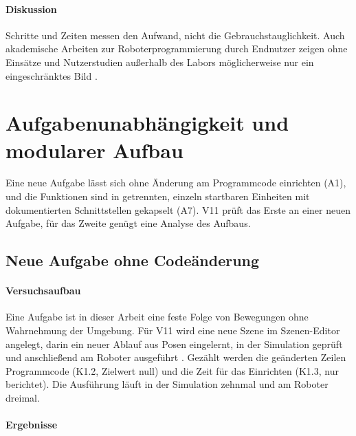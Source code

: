 
\paragraph*{Diskussion}
Schritte und Zeiten messen den Aufwand, nicht die Gebrauchstauglichkeit.
Auch akademische Arbeiten zur Roboterprogrammierung durch Endnutzer zeigen ohne Einsätze und Nutzerstudien außerhalb des Labors möglicherweise nur ein eingeschränktes Bild \cite{Ajaykumar2021}.

\section{Aufgabenunabhängigkeit und modularer Aufbau}
\label{sec:eval_f4}
Eine neue Aufgabe lässt sich ohne Änderung am Programmcode einrichten (A1), und die Funktionen sind in getrennten, einzeln startbaren Einheiten mit dokumentierten Schnittstellen gekapselt (A7).
V11 prüft das Erste an einer neuen Aufgabe, für das Zweite genügt eine Analyse des Aufbaus.

\subsection{Neue Aufgabe ohne Codeänderung}
\label{sec:eval_aufgaben}

\paragraph*{Versuchsaufbau}
Eine Aufgabe ist in dieser Arbeit eine feste Folge von Bewegungen ohne Wahrnehmung der Umgebung.
Für V11 wird eine neue Szene im Szenen-Editor angelegt, darin ein neuer Ablauf aus Posen eingelernt, in der Simulation geprüft und anschließend am Roboter ausgeführt .
Gezählt werden die geänderten Zeilen Programmcode (K1.2, Zielwert null) und die Zeit für das Einrichten (K1.3, nur berichtet).
Die Ausführung läuft in der Simulation zehnmal und am Roboter dreimal.

\paragraph*{Ergebnisse}

